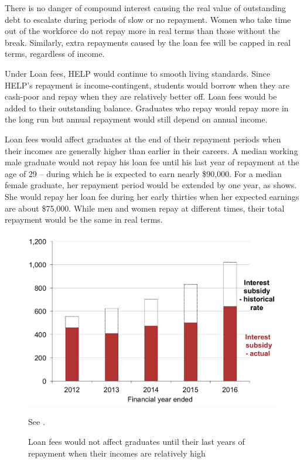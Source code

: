 \documentclass[embargoed]{grattan}
\begin{document}
There is no danger of compound interest causing the real value of outstanding debt to escalate during periods of slow or no repayment.
Women who take time out of the workforce do not repay more in real terms than those without the break.
Similarly, extra repayments caused by the loan fee will be capped in real terms, regardless of income.

Under \gls{Loan fees}, \gls{HELP} would continue to smooth living standards.
Since \gls{HELP}'s repayment is income-contingent, students would borrow when they are cash-poor and repay when they are relatively better off.
\Gls{Loan fees} would be added to their outstanding balance.
Graduates who repay would repay more in the long run but annual repayment would still depend on annual income.

\Gls{Loan fees} would affect graduates at the end of their repayment periods when their incomes are generally higher than earlier in their careers.
A median working male graduate would not repay his loan fee until his last year of repayment at the age of 29 -- during which he is expected to earn nearly \$90,000.
For a median female graduate, her repayment period would be extended by one year, as  shows.
She would repay her loan fee during her early thirties when her expected earnings are about \$75,000.
While men and women repay at different times, their total repayment would be the same in real terms.

\begin{figure}
\caption{\Gls{Loan fees} would not affect graduates until their last years of repayment when their incomes are relatively high}\label{fig:fig21-loan-fees-would-not-affect-grads-until-their-last-years-of-repayment-when-their-incomes-are-relatively-high}


\includegraphics[page=21]{atlas/Chartpack.pdf}

{See .}
\end{figure}
\end{document}
